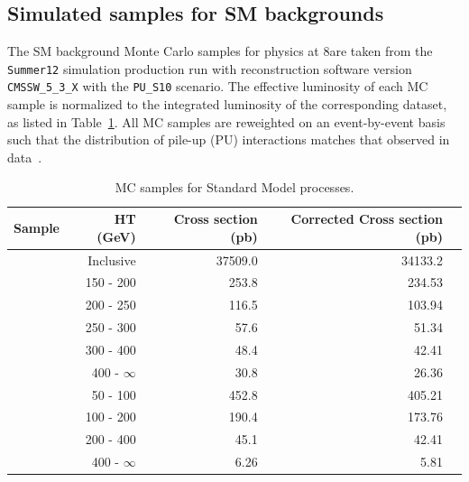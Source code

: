\subsection{Simulated samples for SM backgrounds\label{sec:mc-samples}}

The SM background Monte Carlo samples for physics at 8\TeV are taken
from the \verb!Summer12! simulation production run with reconstruction
software version \verb!CMSSW_5_3_X! with the \verb!PU_S10! scenario. The effective
luminosity of each MC sample is normalized to the integrated
luminosity of the corresponding dataset, as listed in
Table~\ref{tab:mc-sm}.  All MC samples are reweighted on an 
event-by-event basis such that the distribution of pile-up (PU) 
interactions matches that observed in data~\cite{pu-reweight}.

\begin{center}
  \begin{table}[h]
    \caption{MC samples for Standard Model processes.}
    \label{tab:mc-sm}
    \centering
    \tiny
    \begin{tabular}{ lrrrr }
      \hline
      Sample & HT (GeV) & Cross section (pb) & Corrected Cross section (pb) \\%
      \hline
      \hline
      \wlnu  		& Inclusive         & 37509.0 & 34133.2  \\   %
      \wlnu  		& 150 - 200         & 253.8   & 234.53   \\   %
      \wlnu  		& 200 - 250         & 116.5   & 103.94   \\   %
      \wlnu  		& 250 - 300         & 57.6    & 51.34    \\   %
      \wlnu  		& 300 - 400         & 48.4    & 42.41    \\   %
      \wlnu  		& 400 - $\infty$    & 30.8    & 26.36    \\   %
      \znunu 		& 50 - 100          & 452.8   & 405.21   \\   %
      \znunu 		& 100 - 200         & 190.4   & 173.76   \\   %
      \znunu 		& 200 - 400         & 45.1    & 42.41    \\   %
      \znunu 		& 400 - $\infty$    & 6.26    & 5.81     \\   %

\end{tabular}
\end{table}
\end{center}
